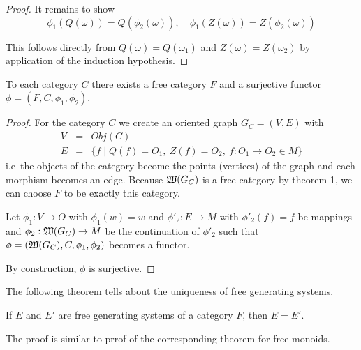 \begin{proof}
It remains to show 
\[ \phi_1(Q(\omega)) = Q(\phi_2(\omega)),\quad \phi_1(Z(\omega)) =
Z(\phi_2(\omega)) \]

This follows directly from $Q(\omega) = Q(\omega_1)$ and $Z(\omega) =
Z(\omega_2)$ by application of the induction hypothesis.
\end{proof}

\bigskip
\begin{theorem}
To each category $C$ there exists a free category $F$ and a surjective functor
$\phi = (F, C, \phi_1, \phi_2)$.
\end{theorem}

\begin{proof}
For the category $C$ we create an oriented graph $G_C = (V, E)$ with 
\begin{eqnarray*}
V &=& Obj(C) \\
E &=& \{ f \mid Q(f) = O_1,\ Z(f) = O_2,\ f : O_1 \to O_2 \in M \}
\end{eqnarray*}
i.e\ the objects of the category become the points (vertices) of the graph and
each morphism becomes an edge. Because $\mbox{$\mathfrak{W}(G_C)$}$ is a free category by
theorem 1, we can choose $F$ to be exactly this category.

Let $\phi_1 : V \to O$ with $\phi_1(w) = w$ and $\phi'_2 : E \to M$ with
$\phi'_2(f) = f$ be mappings and $\phi_2 : \mbox{$\mathfrak{W}(G_C)$} \to M$ be the
continuation of $\phi'_2$ such that $\phi = (\mbox{$\mathfrak{W}(G_C)$}, C, \phi_1, \phi_2)$
becomes a functor.

By construction, $\phi$ is surjective.
\end{proof}

\bigskip
The following theorem tells about the uniqueness of free generating systems.
\begin{theorem}
If $E$ and $E'$ are free generating systems of a category $F$, then $E = E'$.
\end{theorem}

The proof is similar to prrof of the corresponding theorem for free monoids.
